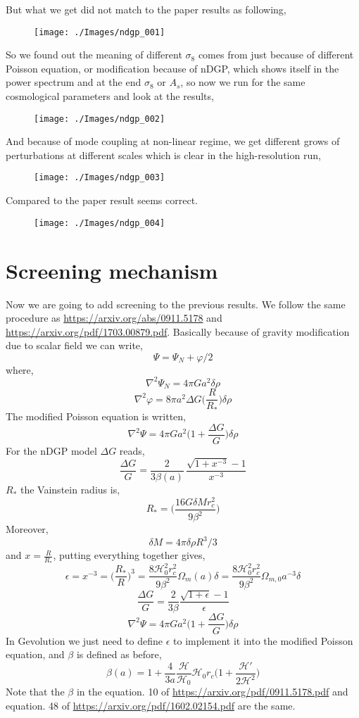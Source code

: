 \documentclass[a4paper,10pt]{article}
\def\be{\begin{equation}}
\def\ee{\end{equation}}
\newcommand{\HH}{\mathcal H}
\begin{document}
   But what we get did not match to the paper results as following,
            \begin{figure}[H]
 \texttt{[image: ./Images/ndgp\_001]} 
 \end{figure}
 So we found out the meaning of different $\sigma_8$ comes from just because of different Poisson equation, or modification because of nDGP, which shows itself in the power spectrum and at the end $\sigma_8$ or $A_s$, so now we run for the same cosmological parameters and look at the results,
          \begin{figure}[H]
 \texttt{[image: ./Images/ndgp\_002]} 
 \end{figure}
 And because of mode coupling at non-linear regime, we get different grows of perturbations at different scales which is clear in the high-resolution run,
          \begin{figure}[H]
 \texttt{[image: ./Images/ndgp\_003]} 
 \end{figure}
 Compared to the paper result seems correct.
 
         \begin{figure}[H]
 \texttt{[image: ./Images/ndgp\_004]}  
 \end{figure} 
\section{Screening mechanism}
Now we are going to add screening to the previous results. We follow the same procedure as \url{https://arxiv.org/abs/0911.5178} and \url{https://arxiv.org/pdf/1703.00879.pdf}. Basically because of gravity modification due to scalar field we can write,
\be
\Psi = \Psi_N + \varphi/2
\ee
where,
\be
\nabla^2 \Psi_N = 4 \pi G a^2 \delta \rho
\ee
\be
\nabla^2 \varphi = 8 \pi a^2 \Delta G  \big( \frac{R}{R_*}\big) \delta \rho
\ee
The modified Poisson equation is written,
\be
\nabla^2 \Psi = 4 \pi G a^2 \big( 1+ \frac{\Delta G}{G} \big) \delta \rho
\ee
For the nDGP model $\Delta G$ reads,
\be
\frac{\Delta G}{G } = \frac{2}{3 \beta (a)}   \,\frac{ \sqrt{1+ x^{-3} }-1 }{x^{-3}}
\ee
$R_*$ the Vainstein radius is,
\be
R_* = \Big( \frac{16 G \delta M r_c^2}{9 \beta^2} \Big)
\ee
Moreover,
\be
\delta M= 4 \pi \delta \rho R^3/3
\ee
and  $x= \frac{R}{R_*} $, putting everything together gives,
\be
\epsilon = x^{-3} = \Big(\frac{R_*}{R}\Big)^3 = \frac{8 \HH_0^2 r_c^2}{9 \beta^2} \Omega_m(a) \delta =  \frac{8 \HH_0^2 r_c^2}{9 \beta^2} \Omega_{m,0} a^{-3} \delta
\ee
\be
\frac{\Delta G}{G} = \frac{2}{3 \beta} \frac{ \sqrt{1+\epsilon} -1} {\epsilon}
\ee
\be
\nabla^2 \Psi = 4 \pi G a^2 \big( 1+ \frac{\Delta G}{G} \big) \delta \rho
\ee
In Gevolution we just need to define $\epsilon$ to implement it into the modified Poisson equation,
and $\beta$ is defined as before,
\be
\beta(a) = 1+ \frac{4} {3 a }  \frac{\HH}{\HH_0} \HH_0 r_c    \Big ( 1+ \frac{\HH'}{2 \HH^2} \Big) 
\ee
Note that the $\beta$ in the equation. 10 of \url{https://arxiv.org/pdf/0911.5178.pdf} and equation. 48 of \url{https://arxiv.org/pdf/1602.02154.pdf} are the same.\\
\end{document}
